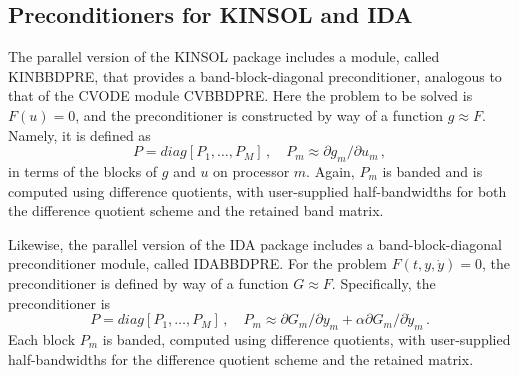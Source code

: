\subsection{Preconditioners for KINSOL and IDA}

The parallel version of the KINSOL package includes a module, called
KINBBDPRE, that provides a band-block-diagonal preconditioner,
analogous to that of the CVODE module CVBBDPRE.  Here the problem to
be solved is $F(u) = 0$, and the preconditioner is constructed by way
of a function $g \approx F$.  Namely, it is defined as
\begin{equation*}
  P = diag[P_1,\ldots,P_M] \, , \quad
  P_m \approx \partial g_m / \partial u_m \, ,
\end{equation*}
in terms of the blocks of $g$ and $u$ on processor $m$.  Again, $P_m$
is banded and is computed using difference quotients, with user-supplied
half-bandwidths for both the difference quotient scheme and the
retained band matrix.

Likewise, the parallel version of the IDA package includes a
band-block-diagonal preconditioner module, called IDABBDPRE.  For the
problem $F(t,y,{\dot y}) = 0$, the preconditioner is defined by way of a
function $G \approx F$.  Specifically, the preconditioner is
\begin{equation*}
  P = diag[P_1,\ldots,P_M] \, ,
  \quad P_m \approx \partial G_m / \partial y_m
  + \alpha \partial G_m / \partial {\dot y}_m \, . 
\end{equation*}
Each block $P_m$ is banded, computed using difference quotients, with
user-supplied half-bandwidths for the difference quotient scheme and
the retained matrix.

